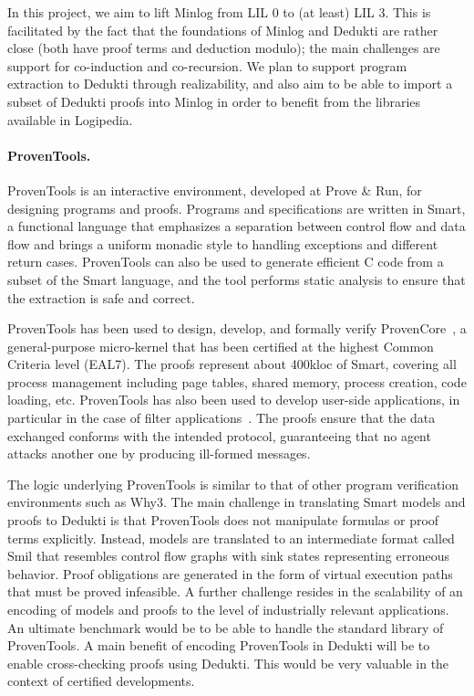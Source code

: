 In this project, we aim to lift Minlog from LIL $0$ to (at least) LIL $3$.
This is facilitated by the fact that the foundations of Minlog and Dedukti are
rather close (both have proof terms and deduction modulo); the main challenges
are support for co-induction and co-recursion. We plan to support program
extraction to Dedukti through realizability, and also aim to be able to
import a subset of Dedukti proofs into Minlog in order to benefit from the
libraries available in Logipedia.

\paragraph*{ProvenTools.}
ProvenTools is an interactive environment, developed at Prove \& Run,
for designing programs and proofs. Programs and specifications are
written in Smart, a functional language that emphasizes a separation
between control flow and data flow and brings a uniform monadic style
to handling exceptions and different return cases.
ProvenTools can also be used to generate efficient C code from a subset
of the Smart language, and the tool performs static analysis to ensure
that the extraction is safe and correct.

ProvenTools has been used to design, develop, and formally verify
ProvenCore~\cite{lescuyer:provencore}, a general-purpose micro-kernel that has
been certified at the highest Common Criteria level (EAL7). The proofs represent
about 400kloc of Smart, covering all process management including page
tables, shared memory, process creation, code loading, etc. ProvenTools has also
been used to develop user-side applications, in particular in the case of filter
applications~\cite{bolignano:security}. The proofs ensure that the data
exchanged conforms with the intended protocol, guaranteeing that no agent
attacks another one by producing ill-formed messages.

The logic underlying ProvenTools is similar to that of other program
verification environments such as Why3. The main challenge in translating
Smart models and proofs to Dedukti is that ProvenTools does not
manipulate formulas or proof terms explicitly. Instead, models are translated to
an intermediate format called Smil that resembles control flow graphs
with sink states representing erroneous behavior. Proof obligations are
generated in the form of virtual execution paths that must be proved infeasible.
A further challenge resides in the scalability of an encoding of models and
proofs to the level of industrially relevant applications. An ultimate benchmark
would be to be able to handle the standard library of ProvenTools. A main
benefit of encoding ProvenTools in Dedukti will be to enable cross-checking
proofs using Dedukti. This would be very valuable in the context of certified
developments.

